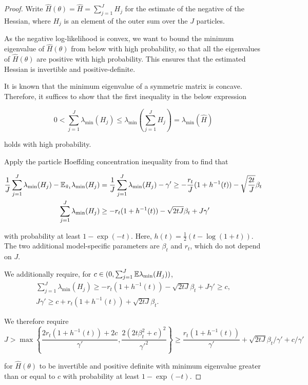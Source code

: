\begin{proof}
Write $\hat{H}(\theta) = \hat{H} = \sum_{j=1}^J H_j$ for the estimate of the negative of the Hessian, where $H_j$ is an element of the outer sum over the $J$ particles.

As the negative log-likelihood is convex, we want to bound the minimum eigenvalue of $\hat{H}(\theta)$ from below with high probability, so that all the eigenvalues of $\hat{H}(\theta)$ are positive with high probability. This ensures that the estimated Hessian is invertible and positive-definite.

It is known that the minimum eigenvalue of a symmetric matrix is concave. Therefore, it suffices to show that the first inequality in the below expression

\begin{equation}
    0 < \sum_{j=1}^J \lambda_{\min} (H_j) \leq  \lambda_{\min}\left(\sum_{j=1}^J H_j\right) = \lambda_{\min} (\hat{H})
\end{equation}

holds with high probability.

Apply the particle Hoeffding concentration inequality from \cite{delMoral11} to find that  


\begin{align}
    \frac{1}{J}\sum_{j=1}^J \lambda_{\min}(H_j) - \mathbb{E}_{\tilde{\pi}_t}\lambda_{\min}(H_j) &= \frac{1}{J}\sum_{j=1}^J \lambda_{\min}(H_j) - \gamma' \geq -\frac{r_t}{J}(1+h^{-1}(t)) - \sqrt{\frac{2t}{J}}\beta_t \\
    \sum_{j=1}^J \lambda_{\min}(H_j) &\geq -r_t(1+h^{-1}(t)) - \sqrt{2tJ}\beta_t + J\gamma'
\end{align}


with probability at least $1-\exp(-t)$. Here, $h(t) = \frac{1}{2}(t - \log(1+t))$. The two additional model-specific parameters are $\beta_t$ and $r_t$, which do not depend on $J$. 

We additionally require, for $c \in (0, \sum_{j=1}^J \mathbb{E}\lambda_{\min}(H_j))$,
\begin{align}
    \sum_{j=1}^J \lambda_{\min}(H_j) \geq -r_t(1+h^{-1}(t)) - \sqrt{2tJ}\beta_t + J\gamma' \geq c, \\
    J\gamma' \geq c + r_t(1+h^{-1}(t)) + \sqrt{2tJ}\beta_t.
\end{align}

We therefore require $$J > \max\left\{\frac{2r_t(1+h^{-1}(t)) + 2c}{\gamma'}, \frac{2(2t\beta_t^2+c)^2}{\gamma'^2}\right\} \geq  \frac{r_t(1+h^{-1}(t))}{\gamma'} + \sqrt{2tJ}\beta_t/\gamma' + c/\gamma'$$

for $\hat{H}(\theta)$ to be invertible and positive definite with minimum eigenvalue greater than or equal to $c$ with probability at least $1-\exp(-t)$.

\end{proof}


